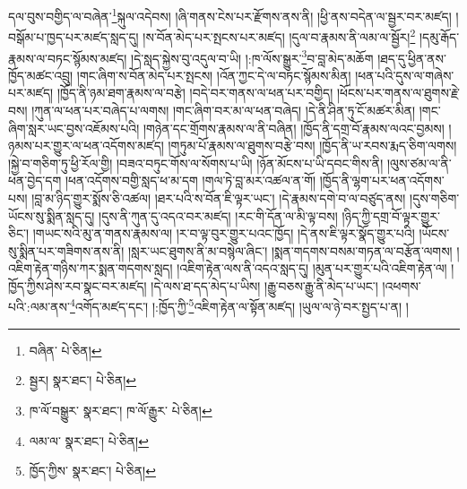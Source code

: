 དལ་བུས་བགྱིད་ལ་བཞེན་\footnote{བཞིན་  པེ་ཅིན། }སྐུལ་འདེབས། །ཞི་གནས་ངེས་པར་རྫོགས་ནས་ནི། །ཕྱི་ནས་བདེན་ལ་སྦྱར་བར་མཛད། །བསྒོམ་པ་ཁྱད་པར་མཛད་སླད་དུ། །ས་བོན་མེད་པར་སྤངས་པར་མཛད། །དུལ་བ་རྣམས་ནི་ལམ་ལ་སྦྱོར།\footnote{སྦྱར།  སྣར་ཐང་།  པེ་ཅིན། } །དམུ་རྒོད་རྣམས་ལ་བཏང་སྙོམས་མཛད། །དེ་སླད་སྐྱེས་བུ་འདུལ་བ་ཡི། །:ཁ་ལོས་སྒྱུར་\footnote{ཁ་ལོ་བསྒྱུར་  སྣར་ཐང་། ཁ་ལོ་རྒྱུར་  པེ་ཅིན། }བ་བླ་མེད་མཆོག །ཐད་དུ་ཕྱིན་ནས་ཁྱོད་མཚང་འབྲུ། །གང་ཞིག་ས་བོན་མེད་པར་སྤངས། །འོན་ཀྱང་དེ་ལ་བཏང་སྙོམས་མིན། །ཕན་པའི་དུས་ལ་གཞེས་པར་མཛད། །ཁྱོད་ནི་ཉམ་ཐག་རྣམས་ལ་བརྩེ། །བདེ་བར་གནས་ལ་ཕན་པར་བགྱིད། །ཕོངས་པར་གནས་ལ་ཐུགས་རྗེ་བས། །ཀུན་ལ་ཕན་པར་བཞེད་པ་ལགས། །གང་ཞིག་བར་མ་ལ་ཕན་བཞེད། །དེ་ནི་ཤིན་ཏུ་ངོ་མཚར་མིན། །གང་ཞིག་སླར་ཡང་བྱས་འཇོམས་པའི། །གཉེན་དང་གྲོགས་རྣམས་ལ་ནི་བཞིན། །ཁྱོད་ནི་དགྲ་བོ་རྣམས་ལའང་བྱམས། །ཉམས་པར་གྱུར་ལ་ཕན་འདོགས་མཛད། །གཏུམ་པོ་རྣམས་ལ་ཐུགས་བརྩེ་བས། །ཁྱོད་ནི་ཡ་རབས་རྨད་ཅིག་ལགས། །སྐྱེ་བ་གཅིག་ཏུ་ཕྱི་རོལ་གྱི། །བཟའ་བཏུང་གོས་ལ་སོགས་པ་ཡི། །ཉོན་མོངས་པ་ཡི་དབང་གིས་ནི། །ལུས་ཙམ་ལ་ནི་ཕན་བྱེད་དག །ཕན་འདོགས་བགྱི་སླད་ཕ་མ་དག །གལ་ཏེ་བླ་མར་འཚལ་ན་གོ། །ཁྱོད་ནི་ལྷག་པར་ཕན་འདོགས་པས། །བླ་མ་ཉིད་གྱུར་སྨོས་ཅི་འཚལ། །ཐར་པའི་ས་བོན་ཇི་ལྟར་ཡང་། །དེ་རྣམས་དགེ་བ་ལ་བཙུད་ནས། །དུས་གཅིག་ཡོངས་སུ་སྨིན་སླད་དུ། །དུས་ནི་ཀུན་དུ་འདའ་བར་མཛད། །རང་གི་དོན་ལ་མི་ལྟ་བས། །ཉིད་ཀྱི་དགྲ་བོ་ལྟར་གྱུར་ཅིང་། །གཡང་སའི་མུ་ན་གནས་རྣམས་ལ། །ར་བ་ལྟ་བུར་གྱུར་པའང་ཁྱོད། །དེ་ནས་ཇི་ལྟར་སྣོད་གྱུར་པའི། །ཡོངས་སུ་སྨིན་པར་གཟིགས་ནས་ནི། །སླར་ཡང་ཐུགས་ནི་མ་བསྙེལ་ཞིང་། །སྨན་གདགས་བསམ་གཏན་ལ་བརྩོན་ལགས། །འཇིག་རྟེན་གཉིས་ཀར་སྨན་གདགས་སླད། །འཇིག་རྟེན་ལས་ནི་འདའ་སླད་དུ། །མུན་པར་གྱུར་པའི་འཇིག་རྟེན་ལ། །ཁྱོད་ཀྱིས་ཤེས་རབ་སྣང་བར་མཛད། །དེ་ལས་ཐ་དད་མེད་པ་ཡིས། །རྒྱུ་བཅས་རྒྱུ་ནི་མེད་པ་ཡང་། །འཕགས་པའི་:ལམ་ནས་\footnote{ལམ་ལ་  སྣར་ཐང་།  པེ་ཅིན། }འགོད་མཛད་དང་། །:ཁྱོད་ཀྱི་\footnote{ཁྱོད་ཀྱིས་  སྣར་ཐང་།  པེ་ཅིན། }འཇིག་རྟེན་ལ་སྟོན་མཛད། །ཡུལ་ལ་ཉེ་བར་སྤྱད་པ་ན། །
